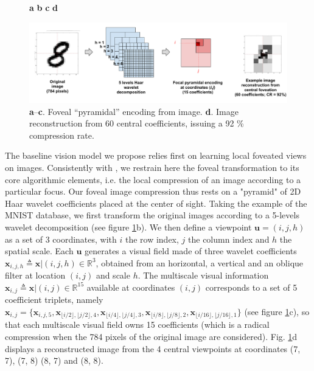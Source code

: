 \documentclass[12pt,twoside,openright]{article}
\begin{document}
\begin{figure}[b!]
	\centerline{
		\hspace{2cm}
		\textbf{a}
		\hspace{4cm}
		\textbf{b}	
		\hspace{3cm}
		\textbf{c}
		\hspace{3cm}
		\textbf{d}
		\hspace{2cm}			
	}
	\centerline{
		\includegraphics[width = \linewidth]{img/ICLR-foveated-model.pdf} 
	}
	
	\caption{\textbf{a}--\textbf{c}. Foveal ``pyramidal'' encoding from image.
		\textbf{d}. Image reconstruction from 60 central coefficients, issuing a 92 \% compression rate.  
		}\label{fig:foveated}
\end{figure}

The baseline vision model we propose relies first on learning local foveated views on images.
Consistently with \citep{kortum1996implementation,wang2003foveation}, we restrain here the foveal transformation to its core algorithmic elements, i.e. the local compression of an image according to a particular focus. Our foveal image compression thus rests on a "pyramid" of 2D Haar wavelet coefficients placed at the center of sight. Taking the example of the MNIST database, we first transform the original images according to a 5-levels wavelet decomposition (see figure \ref{fig:foveated}b). We then define a viewpoint $\boldsymbol{u} = (i,j,h)$ as a set of 3 coordinates, with $i$ the row index, $j$ the column index and $h$ the spatial scale. Each $\boldsymbol{u}$ generates a visual field made of three wavelet coefficients $\boldsymbol{x}_{i,j,h} \triangleq\boldsymbol{x}|(i,j,h) \in \mathbb{R}^3$, obtained from an horizontal, a vertical and an oblique filter at location $(i,j)$ and scale $h$.  The multiscale visual information $\boldsymbol{x}_{i,j}\triangleq\boldsymbol{x}|(i,j) \in \mathbb{R}^{15}$ available at coordinates $(i,j)$ corresponds to a set of 5 coefficient triplets, namely $\boldsymbol{x}_{i,j}=\{\boldsymbol{x}_{i,j,5}, \boldsymbol{x}_{\lfloor i/2\rfloor,\lfloor j/2\rfloor,4}, \boldsymbol{x}_{\lfloor i/4\rfloor,\lfloor j/4\rfloor,3}, \boldsymbol{x}_{\lfloor i/8\rfloor,\lfloor j/8\rfloor, 2}, \boldsymbol{x}_{\lfloor i/16\rfloor,\lfloor j/16\rfloor, 1}\}$ (see figure \ref{fig:foveated}c), so that each multiscale visual field owns 15 coefficients (which is a radical compression when the 784 pixels of the original image are considered).
Fig. \ref{fig:foveated}d displays a reconstructed image from the 4 central viewpoints at coordinates (7, 7), (7, 8) (8, 7) and (8, 8).
\end{document}
